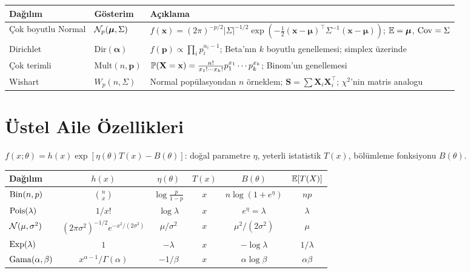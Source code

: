 \begin{center}
\renewcommand{\arraystretch}{1.6}
\small
\begin{tabular}{p{3cm}p{2.5cm}p{7cm}}
\hline
\textbf{Dağılım} & \textbf{Gösterim} & \textbf{Açıklama} \\
\hline
Çok boyutlu Normal & $\mathcal{N}_p(\boldsymbol\mu,\Sigma)$ & $f(\mathbf{x})=(2\pi)^{-p/2}|\Sigma|^{-1/2}\exp\!\left(-\tfrac{1}{2}(\mathbf{x}-\boldsymbol\mu)^\top\Sigma^{-1}(\mathbf{x}-\boldsymbol\mu)\right)$; $\mathbb{E}=\boldsymbol\mu$, $\operatorname{Cov}=\Sigma$ \\
Dirichlet & $\mathrm{Dir}(\boldsymbol\alpha)$ & $f(\mathbf{p})\propto\prod_i p_i^{\alpha_i-1}$; Beta'nın $k$ boyutlu genellemesi; simplex üzerinde \\
Çok terimli & $\mathrm{Mult}(n,\mathbf{p})$ & $\mathbb{P}(\mathbf{X}=\mathbf{x})=\frac{n!}{x_1!\cdots x_k!}p_1^{x_1}\cdots p_k^{x_k}$; Binom'un genellemesi \\
Wishart & $W_p(n,\Sigma)$ & Normal popülasyondan $n$ örneklem; $\mathbf{S}=\sum \mathbf{X}_i\mathbf{X}_i^\top$; $\chi^2$'nin matris analogu \\
\hline
\end{tabular}
\end{center}

\section{Üstel Aile Özellikleri}
\label{app:ustel_aile}

\begin{tanim}
$f(x;\theta) = h(x)\exp[\eta(\theta)T(x) - B(\theta)]$: doğal parametre $\eta$, yeterli istatistik $T(x)$, bölümleme fonksiyonu $B(\theta)$.
\end{tanim}

\begin{center}
\renewcommand{\arraystretch}{1.5}
\small
\begin{tabular}{p{2.2cm}ccccc}
\hline
\textbf{Dağılım} & $h(x)$ & $\eta(\theta)$ & $T(x)$ & $B(\theta)$ & $\mathbb{E}[T(X)]$ \\
\hline
$\operatorname{Bin}(n,p)$ & $\binom{n}{x}$ & $\log\frac{p}{1-p}$ & $x$ & $n\log(1+e^\eta)$ & $np$ \\
$\operatorname{Pois}(\lambda)$ & $1/x!$ & $\log\lambda$ & $x$ & $e^\eta=\lambda$ & $\lambda$ \\
$\mathcal{N}(\mu,\sigma^2)$ & $(2\pi\sigma^2)^{-1/2}e^{-x^2/(2\sigma^2)}$ & $\mu/\sigma^2$ & $x$ & $\mu^2/(2\sigma^2)$ & $\mu$ \\
$\operatorname{Exp}(\lambda)$ & $1$ & $-\lambda$ & $x$ & $-\log\lambda$ & $1/\lambda$ \\
$\operatorname{Gama}(\alpha,\beta)$ & $x^{\alpha-1}/\Gamma(\alpha)$ & $-1/\beta$ & $x$ & $\alpha\log\beta$ & $\alpha\beta$ \\
\hline
\end{tabular}
\end{center}

